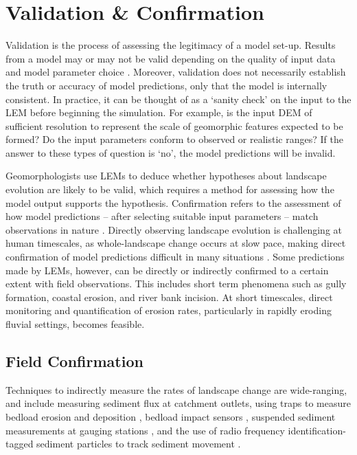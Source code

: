 \section{Validation \& Confirmation}
Validation is the process of assessing the legitimacy of a model set-up. Results from a model may or may not be valid depending on the quality of input data and model parameter choice \citep{oreskes1994verification}. Moreover, validation does not necessarily establish the truth or accuracy of model predictions, only that the model is internally consistent. In practice, it can be thought of as a `sanity check' on the input to the LEM before beginning the simulation. For example, is the input DEM of sufficient resolution to represent the scale of geomorphic features expected to be formed? Do the input parameters conform to observed or realistic ranges? If the answer to these types of question is `no', the model predictions will be invalid. 

Geomorphologists use LEMs to deduce whether hypotheses about landscape evolution are likely to be valid, which requires a method for assessing how the model output supports the hypothesis. Confirmation refers to the assessment of how model predictions -- after selecting suitable input parameters -- match observations in nature \citep{oreskes1994verification}. Directly observing landscape evolution is challenging at human timescales, as whole-landscape change occurs at slow pace, making direct confirmation of model predictions difficult in many situations \citep{Hasbargen2003,hoey2003testing}. Some predictions made by LEMs, however, can be directly or indirectly confirmed to a certain extent with field observations. This includes short term phenomena such as gully formation, coastal erosion, and river bank incision. At short timescales, direct monitoring and quantification of erosion rates, particularly in rapidly eroding fluvial settings, becomes feasible. 

\subsection{Field Confirmation}
Techniques to indirectly measure the rates of landscape change are wide-ranging, and include measuring sediment flux at catchment outlets, using traps to measure bedload erosion and deposition \citep{Bunte2004}, bedload impact sensors \citep{rickenmann2007continuous,turowski2010partitioning}, suspended sediment measurements at gauging stations \citep{brazier2004quantifying}, and the use of radio frequency identification-tagged sediment particles to track sediment movement \citep{chapuis2015coupling,Beer2015}.

